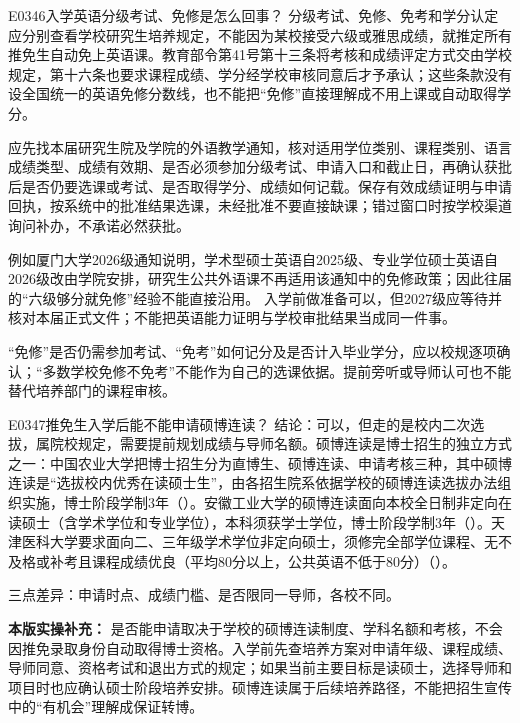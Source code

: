 \begin{qa}{E0346}{入学英语分级考试、免修是怎么回事？}
分级考试、免修、免考和学分认定应分别查看学校研究生培养规定，不能因为某校接受六级或雅思成绩，就推定所有推免生自动免上英语课。教育部令第41号第十三条将考核和成绩评定方式交由学校规定，第十六条也要求课程成绩、学分经学校审核同意后才予承认；这些条款没有设全国统一的英语免修分数线，也不能把“免修”直接理解成不用上课或自动取得学分。

应先找本届研究生院及学院的外语教学通知，核对适用学位类别、课程类别、语言成绩类型、成绩有效期、是否必须参加分级考试、申请入口和截止日，再确认获批后是否仍要选课或考试、是否取得学分、成绩如何记载。保存有效成绩证明与申请回执，按系统中的批准结果选课，未经批准不要直接缺课；错过窗口时按学校渠道询问补办，不承诺必然获批。

例如厦门大学2026级通知说明，学术型硕士英语自2025级、专业学位硕士英语自2026级改由学院安排，研究生公共外语课不再适用该通知中的免修政策；因此往届的“六级够分就免修”经验不能直接沿用。 入学前做准备可以，但2027级应等待并核对本届正式文件；不能把英语能力证明与学校审批结果当成同一件事。

“免修”是否仍需参加考试、“免考”如何记分及是否计入毕业学分，应以校规逐项确认；“多数学校免修不免考”不能作为自己的选课依据。提前旁听或导师认可也不能替代培养部门的课程审核。
\end{qa}

\begin{qa}{E0347}{推免生入学后能不能申请硕博连读？}
结论：可以，但走的是校内二次选拔，属院校规定，需要提前规划成绩与导师名额。硕博连读是博士招生的独立方式之一：中国农业大学把博士招生分为直博生、硕博连读、申请考核三种，其中硕博连读是“选拔校内优秀在读硕士生”，由各招生院系依据学校的硕博连读选拔办法组织实施，博士阶段学制3年（）。安徽工业大学的硕博连读面向本校全日制非定向在读硕士（含学术学位和专业学位），本科须获学士学位，博士阶段学制3年（）。天津医科大学要求面向二、三年级学术学位非定向硕士，须修完全部学位课程、无不及格或补考且课程成绩优良（平均80分以上，公共英语不低于80分）（）。

三点差异：申请时点、成绩门槛、是否限同一导师，各校不同。
\par\textbf{本版实操补充：} 是否能申请取决于学校的硕博连读制度、学科名额和考核，不会因推免录取身份自动取得博士资格。入学前先查培养方案对申请年级、课程成绩、导师同意、资格考试和退出方式的规定；如果当前主要目标是读硕士，选择导师和项目时也应确认硕士阶段培养安排。硕博连读属于后续培养路径，不能把招生宣传中的“有机会”理解成保证转博。
\end{qa}

